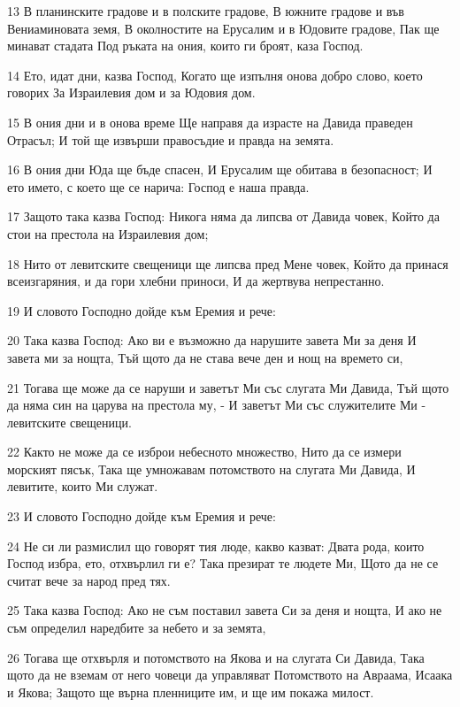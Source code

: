 \par 13 В планинските градове и в полските градове, В южните градове и във Вениаминовата земя, В околностите на Ерусалим и в Юдовите градове, Пак ще минават стадата Под ръката на ония, които ги броят, каза Господ.
\par 14 Ето, идат дни, казва Господ, Когато ще изпълня онова добро слово, което говорих За Израилевия дом и за Юдовия дом.
\par 15 В ония дни и в онова време Ще направя да израсте на Давида праведен Отрасъл; И той ще извърши правосъдие и правда на земята.
\par 16 В ония дни Юда ще бъде спасен, И Ерусалим ще обитава в безопасност; И ето името, с което ще се нарича: Господ е наша правда.
\par 17 Защото така казва Господ: Никога няма да липсва от Давида човек, Който да стои на престола на Израилевия дом;
\par 18 Нито от левитските свещеници ще липсва пред Мене човек, Който да принася всеизгаряния, и да гори хлебни приноси, И да жертвува непрестанно.
\par 19 И словото Господно дойде към Еремия и рече:
\par 20 Така казва Господ: Ако ви е възможно да нарушите завета Ми за деня И завета ми за нощта, Тъй щото да не става вече ден и нощ на времето си,
\par 21 Тогава ще може да се наруши и заветът Ми със слугата Ми Давида, Тъй щото да няма син на царува на престола му, - И заветът Ми със служителите Ми - левитските свещеници.
\par 22 Както не може да се изброи небесното множество, Нито да се измери морският пясък, Така ще умножавам потомството на слугата Ми Давида, И левитите, които Ми служат.
\par 23 И словото Господно дойде към Еремия и рече:
\par 24 Не си ли размислил що говорят тия люде, какво казват: Двата рода, които Господ избра, ето, отхвърлил ги е? Така презират те людете Ми, Щото да не се считат вече за народ пред тях.
\par 25 Така казва Господ: Ако не съм поставил завета Си за деня и нощта, И ако не съм определил наредбите за небето и за земята,
\par 26 Тогава ще отхвърля и потомството на Якова и на слугата Си Давида, Така щото да не вземам от него човеци да управляват Потомството на Авраама, Исаака и Якова; Защото ще върна пленниците им, и ще им покажа милост.

